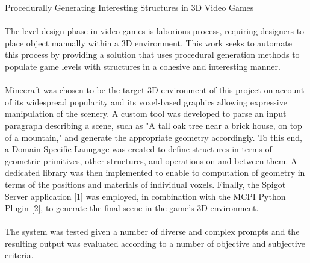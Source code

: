 \documentclass[11pt, a4paper]{article}
\begin{document}
\begin{flushleft}

Procedurally Generating Interesting Structures in 3D Video Games\linebreak


\paragraph*{}
The level design phase in video games is laborious process, requiring designers to place object manually within a 3D environment.
This work seeks to automate this process by providing a solution that uses procedural generation methods to populate game levels with structures in a cohesive and interesting manner.



\paragraph*{}
Minecraft was chosen to be the target 3D environment of this project on account of its widespread popularity and its voxel-based graphics allowing expressive manipulation of the scenery.
A custom tool was developed to parse an input paragraph describing a scene, such as "A tall oak tree near a brick house, on top of a mountain," and generate the appropriate geometry accordingly.
To this end, a Domain Specific Lanugage was created to define structures in terms of geometric primitives, other structures, and operations on and between them.
A dedicated library was then implemented to enable to computation of geometry in terms of the positions and materials of individual voxels.
Finally, the Spigot Server application [1] was employed, in combination with the MCPI Python Plugin [2], to generate the final scene in the game's 3D environment.

\paragraph*{}
The system was tested given a number of diverse and complex prompts and the resulting output was evaluated according to a number of objective and subjective criteria.

\end{flushleft}
\end{document}
